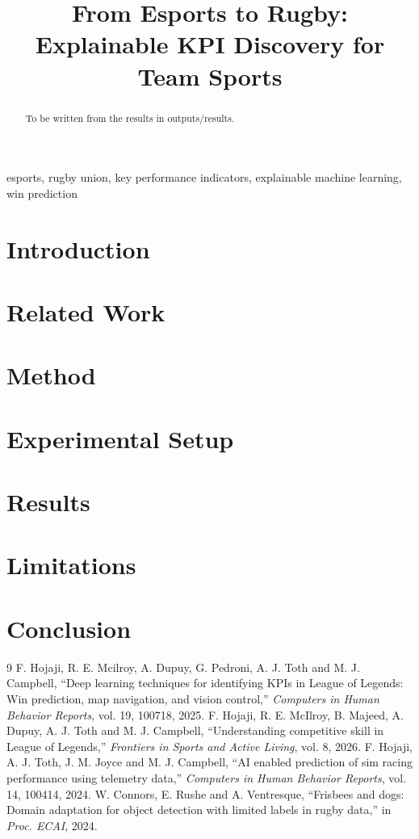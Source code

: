\documentclass[conference]{IEEEtran}
\begin{document}
\title{From Esports to Rugby: Explainable KPI Discovery for Team Sports}
\author{}
\maketitle
\begin{abstract}
To be written from the results in outputs/results.
\end{abstract}
\begin{IEEEkeywords}
esports, rugby union, key performance indicators, explainable machine learning, win prediction
\end{IEEEkeywords}
\section{Introduction}
\section{Related Work}
\section{Method}
\section{Experimental Setup}
\section{Results}
\section{Limitations}
\section{Conclusion}

\begin{thebibliography}{9}
 F. Hojaji, R. E. Mcilroy, A. Dupuy, G. Pedroni, A. J. Toth and M. J. Campbell, ``Deep learning techniques for identifying KPIs in League of Legends: Win prediction, map navigation, and vision control,'' \emph{Computers in Human Behavior Reports}, vol. 19, 100718, 2025.
 F. Hojaji, R. E. McIlroy, B. Majeed, A. Dupuy, A. J. Toth and M. J. Campbell, ``Understanding competitive skill in League of Legends,'' \emph{Frontiers in Sports and Active Living}, vol. 8, 2026.
 F. Hojaji, A. J. Toth, J. M. Joyce and M. J. Campbell, ``AI enabled prediction of sim racing performance using telemetry data,'' \emph{Computers in Human Behavior Reports}, vol. 14, 100414, 2024.
 W. Connors, E. Rushe and A. Ventresque, ``Frisbees and dogs: Domain adaptation for object detection with limited labels in rugby data,'' in \emph{Proc. ECAI}, 2024.
\end{thebibliography}
\end{document}

